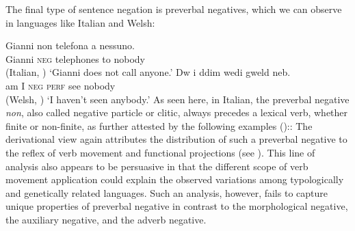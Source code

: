 \documentclass[output=paper
                ,modfonts
                ,nonflat
	        ,collection
	        ,collectionchapter
	        ,collectiontoclongg
 	        ,biblatex
                ,babelshorthands
                ,newtxmath
                ,draftmode
                ,colorlinks, citecolor=brown
]{./langsci/langscibook}
\begin{document}
{\begin{exe}
\begin{xlist}
The final type of sentence negation is preverbal negatives, which
we can observe in languages like Italian and Welsh:

\eal
\ex \label{negation-position-1a}
\gll Gianni non telefona a nessuno.\\
     Gianni \textsc{neg} telephones to nobody\\ \hfill (Italian, \citealt[]{Borsley:06})
\glt`Gianni does not call anyone.'
\ex \label{negation-position-1c}
\gll Dw i ddim wedi gweld neb.\\
     am I \textsc{neg} \textsc{perf} see nobody\\ \hfill  (Welsh, \citealt[]{Borsley:05})
\glt `I haven't seen anybody.'
\zl
%
%
As seen here, in Italian,
the preverbal negative \textit{non}, also called negative particle or
clitic, always precedes a lexical  verb, whether finite or
non-finite, as further attested by the following
examples (\citealp[Chapter~4]{Kim:00})::
%
\eal
{}
%
%
\zl
%
%
The derivational view again attributes the distribution of such
a preverbal negative to the reflex of verb movement and functional
projections (see \citealt[Chapter~1]{Belletti:90}). This line of analysis also appears to be persuasive
in that the different scope of verb movement application could explain
the observed variations among typologically and genetically related
languages. Such an analysis, however,
  fails to capture unique properties of preverbal negative
  in contrast to the morphological negative, the auxiliary negative, and the adverb negative.


\end{xlist}
\end{exe}}
\end{document}
